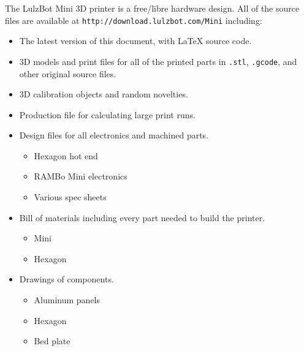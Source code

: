 %
%
%
%
%

The LulzBot\textsuperscript{\miniscule{\texttrademark}} Mini 3D printer is a free/libre hardware design. All of the source files are available at \texttt{http://download.lulzbot.com/Mini} including:

\begin{itemize}
\item The latest version of this document, with {\LaTeX} source code.

\item 3D models and print files for all of the printed parts in \texttt{.stl}, \texttt{.gcode}, and other original source files.

\item 3D calibration objects and random novelties.

\item Production file for calculating large print runs.

\item Design files for all electronics and machined parts.

\begin{itemize} %
\item Hexagon hot end
\item RAMBo Mini electronics
\item Various spec sheets
\end{itemize} %

\item Bill of materials including every part needed to build the printer.
\begin{itemize} %
\item Mini
\item Hexagon
\end{itemize} %

\item Drawings of components.
\begin{itemize} %
\item Aluminum panels
\item Hexagon
\item Bed plate
\end{itemize} %


\end{itemize}
